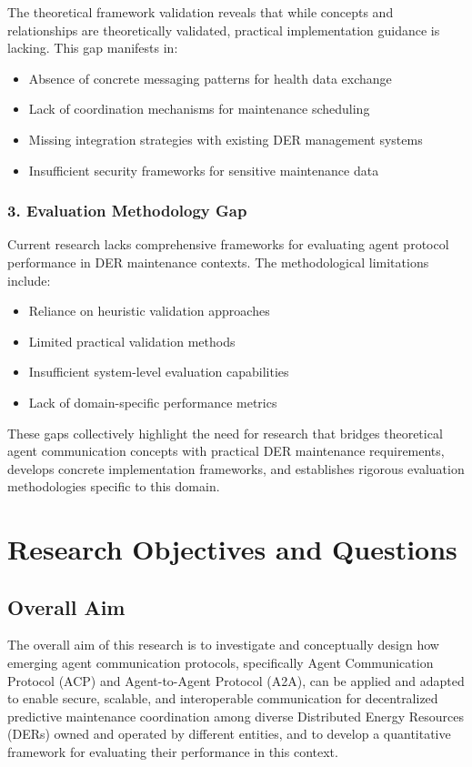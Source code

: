 \documentclass[12pt,a4paper]{article}
\begin{document}
The theoretical framework validation reveals that while concepts and relationships are theoretically validated, practical implementation guidance is lacking. This gap manifests in:
\begin{itemize}
\item Absence of concrete messaging patterns for health data exchange
\item Lack of coordination mechanisms for maintenance scheduling
\item Missing integration strategies with existing DER management systems
\item Insufficient security frameworks for sensitive maintenance data
\end{itemize}

\subsubsection{3. Evaluation Methodology Gap}

Current research lacks comprehensive frameworks for evaluating agent protocol performance in DER maintenance contexts. The methodological limitations include:
\begin{itemize}
\item Reliance on heuristic validation approaches
\item Limited practical validation methods
\item Insufficient system-level evaluation capabilities
\item Lack of domain-specific performance metrics
\end{itemize}

These gaps collectively highlight the need for research that bridges theoretical agent communication concepts with practical DER maintenance requirements, develops concrete implementation frameworks, and establishes rigorous evaluation methodologies specific to this domain.

\section{Research Objectives and Questions}
\label{sec:objectives}

\subsection{Overall Aim}

The overall aim of this research is to investigate and conceptually design how emerging agent communication protocols, specifically Agent Communication Protocol (ACP) and Agent-to-Agent Protocol (A2A), can be applied and adapted to enable secure, scalable, and interoperable communication for decentralized predictive maintenance coordination among diverse Distributed Energy Resources (DERs) owned and operated by different entities, and to develop a quantitative framework for evaluating their performance in this context.
\end{document}
